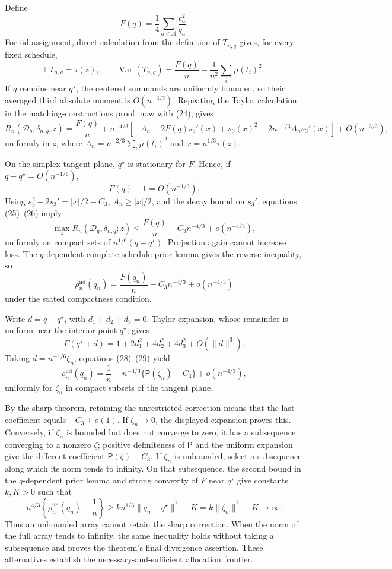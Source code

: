 Define
\[
F(q)=\frac14\sum_{a\in\mathcal A}\frac{c_a^2}{q_a}.
\]
For iid assignment, direct calculation from the definition of \(T_{n,q}\) gives, for every fixed schedule,
\[
\mathbb E T_{n,q}=\tau(z),\qquad
\operatorname{Var}(T_{n,q})
=\frac{F(q)}n-\frac1{n^2}\sum_i\mu(t_i)^2.
\tag{24}
\]
If \(q\) remains near \(q^\star\), the centered summands are uniformly bounded, so their averaged third absolute moment is \(O(n^{-3/2})\).  Repeating the Taylor calculation in the matching-constructions proof, now with (24), gives
\[
R_n(\mathcal D_q,\delta_{n,q};z)
=\frac{F(q)}n+n^{-4/3}
\left[-A_n-2F(q)s_3'(x)+s_3(x)^2
+2n^{-1/3}A_ns_3'(x)\right]
+O(n^{-3/2}),
\tag{25}
\]
uniformly in \(z\), where \(A_n=n^{-2/3}\sum_i\mu(t_i)^2\) and
\(x=n^{1/3}\tau(z)\).

On the simplex tangent plane, \(q^\star\) is stationary for \(F\).  Hence, if \(q-q^\star=O(n^{-1/6})\),
\[
F(q)-1=O(n^{-1/3}).
\tag{26}
\]
Using \(s_3^2-2s_3'=|x|/2-C_3\), \(A_n\geq|x|/2\), and the decay bound on \(s_3'\), equations (25)--(26) imply
\[
\max_zR_n(\mathcal D_q,\delta_{n,q};z)
\leq\frac{F(q)}n-C_3n^{-4/3}+o(n^{-4/3}),
\tag{27}
\]
uniformly on compact sets of \(n^{1/6}(q-q^\star)\).  Projection again cannot increase loss.  The \(q\)-dependent complete-schedule prior lemma gives the reverse inequality, so
\[
\rho_n^{\mathrm{iid}}(q_n)
=\frac{F(q_n)}n-C_3n^{-4/3}+o(n^{-4/3})
\tag{28}
\]
under the stated compactness condition.

Write \(d=q-q^\star\), with \(d_1+d_2+d_3=0\).  Taylor expansion, whose remainder is uniform near the interior point \(q^\star\), gives
\[
F(q^\star+d)
=1+2d_1^2+4d_2^2+4d_3^2+O(\|d\|^3).
\tag{29}
\]
Taking \(d=n^{-1/6}\zeta_n\), equations (28)--(29) yield
\[
\rho_n^{\mathrm{iid}}(q_n)
=\frac1n+n^{-4/3}
\{\mathsf P(\zeta_n)-C_3\}+o(n^{-4/3}),
\]
uniformly for \(\zeta_n\) in compact subsets of the tangent plane.

By the sharp theorem, retaining the unrestricted correction means that the last coefficient equals \(-C_3+o(1)\).  If \(\zeta_n\to0\), the displayed expansion proves this.  Conversely, if \(\zeta_n\) is bounded but does not converge to zero, it has a subsequence converging to a nonzero \(\zeta\); positive definiteness of \(\mathsf P\) and the uniform expansion give the different coefficient \(\mathsf P(\zeta)-C_3\).  If \(\zeta_n\) is unbounded, select a subsequence along which its norm tends to infinity.  On that subsequence, the second bound in the \(q\)-dependent prior lemma and strong convexity of \(F\) near \(q^\star\) give constants \(k,K>0\) such that
\[
n^{4/3}\left\{\rho_n^{\mathrm{iid}}(q_n)-\frac1n\right\}
\geq k n^{1/3}\|q_n-q^\star\|^2-K
=k\|\zeta_n\|^2-K\longrightarrow\infty.
\]
Thus an unbounded array cannot retain the sharp correction.  When the norm of the full array tends to infinity, the same inequality holds without taking a subsequence and proves the theorem's final divergence assertion.  These alternatives establish the necessary-and-sufficient allocation frontier.

